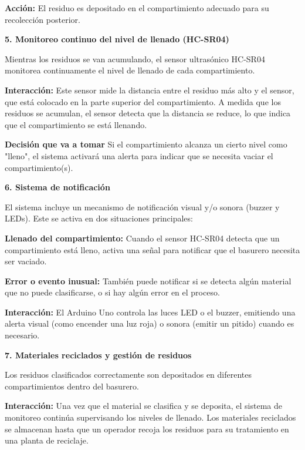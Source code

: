 	\textbf{Acción:} El residuo es depositado en el compartimiento adecuado para su recolección posterior. 

	\textbf{5. Monitoreo continuo del nivel de llenado (HC-SR04)} 

Mientras los residuos se van acumulando, el sensor ultrasónico HC-SR04 monitorea continuamente el nivel de llenado de cada compartimiento. 

    \textbf{Interacción:} Este sensor mide la distancia entre el residuo más alto y el sensor, que está colocado en la parte superior del compartimiento. A medida que los residuos se acumulan, el sensor detecta que la distancia se reduce, lo que indica que el compartimiento se está llenando. 

	\textbf{Decisión que va a tomar} Si el compartimiento alcanza un cierto nivel como "lleno", el sistema activará una alerta para indicar que se necesita vaciar el compartimiento(s). 

	\textbf{6. Sistema de notificación} 

El sistema incluye un mecanismo de notificación visual y/o sonora (buzzer y LEDs). Este se activa en dos situaciones principales: 

    \textbf{Llenado del compartimiento:} Cuando el sensor HC-SR04 detecta que un compartimiento está lleno, activa una señal para notificar que el basurero necesita ser vaciado. 

	\textbf{Error o evento inusual:} También puede notificar si se detecta algún material que no puede clasificarse, o si hay algún error en el proceso. 

	\textbf{Interacción:} El Arduino Uno controla las luces LED o el buzzer, emitiendo una alerta visual (como encender una luz roja) o sonora (emitir un pitido) cuando es necesario. 

	\textbf{7. Materiales reciclados y gestión de residuos} 

Los residuos clasificados correctamente son depositados en diferentes compartimientos dentro del basurero. 

    \textbf{Interacción:} Una vez que el material se clasifica y se deposita, el sistema de monitoreo continúa supervisando los niveles de llenado. Los materiales reciclados se almacenan hasta que un operador recoja los residuos para su tratamiento en una planta de reciclaje. 

	\newpage